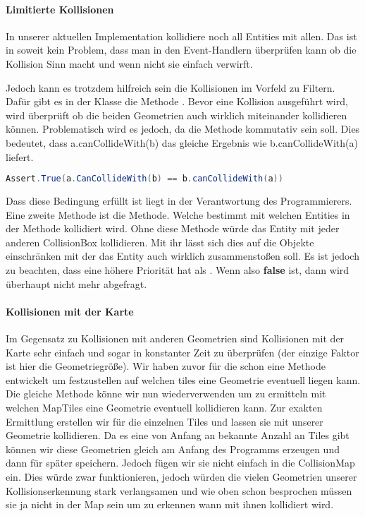 \paragraph{Limitierte Kollisionen}

In unserer aktuellen Implementation kollidiere noch all Entities mit allen. Das ist in soweit kein Problem, dass man in den Event-Handlern überprüfen kann ob die Kollision Sinn macht und wenn nicht sie einfach verwirft.

Jedoch kann es trotzdem hilfreich sein die Kollisionen im Vorfeld zu Filtern. Dafür gibt es in der Klasse  die Methode . Bevor eine Kollision ausgeführt wird, wird überprüft ob die beiden Geometrien auch wirklich miteinander kollidieren können. 
Problematisch wird es jedoch, da die Methode kommutativ sein soll.
Dies bedeutet, dass a.canCollideWith(b) das gleiche Ergebnis wie b.canCollideWith(a) liefert. 

\doinline
\begin{lstlisting}[caption=Kommutative Eigenschaft von canCollideWith, title=\hspace{0 pt}, language=java]
Assert.True(a.CanCollideWith(b) == b.canCollideWith(a))
\end{lstlisting}

Dass diese Bedingung erfüllt ist liegt in der Verantwortung des Programmierers. Eine zweite Methode ist die  Methode. Welche bestimmt mit welchen Entities in der  Methode kollidiert wird. Ohne diese Methode würde das Entity mit jeder anderen CollisionBox kollidieren. Mit ihr lässt sich dies auf die Objekte einschränken mit der das Entity auch wirklich zusammenstoßen soll. Es ist jedoch zu beachten, dass  eine höhere Priorität hat als . Wenn also  \textbf{false} ist, dann wird  überhaupt nicht mehr abgefragt.

\paragraph{Kollisionen mit der Karte}

Im Gegensatz zu Kollisionen mit anderen Geometrien sind Kollisionen mit der Karte sehr einfach und sogar in konstanter Zeit zu überprüfen (der einzige Faktor ist hier die Geometriegröße).
Wir haben zuvor für die  schon eine Methode entwickelt um festzustellen auf welchen tiles eine Geometrie eventuell liegen kann.
Die gleiche Methode könne wir nun wiederverwenden um zu ermitteln mit welchen MapTiles eine Geometrie eventuell kollidieren kann. Zur exakten Ermittlung erstellen wir  für die einzelnen Tiles und lassen sie mit unserer Geometrie kollidieren. Da es eine von Anfang an bekannte Anzahl an Tiles gibt können wir diese Geometrien gleich am Anfang des Programms erzeugen und dann für später speichern. 
Jedoch fügen wir sie nicht einfach in die CollisionMap ein. Dies würde zwar funktionieren, jedoch würden die vielen Geometrien unserer Kollisionserkennung stark verlangsamen und wie oben schon besprochen müssen sie ja nicht in der Map sein um zu erkennen wann mit ihnen kollidiert wird.

